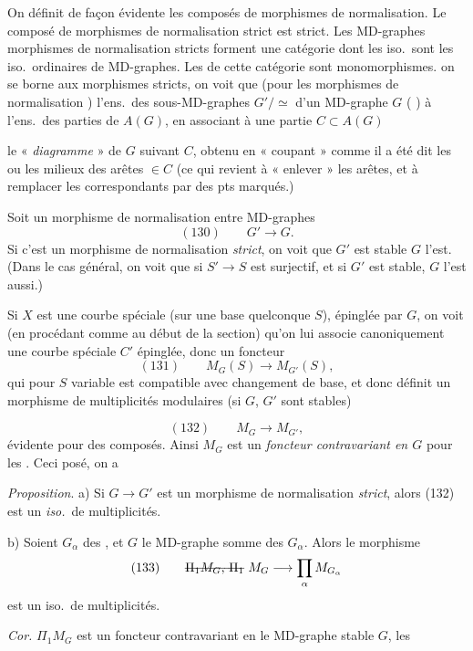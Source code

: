 \documentclass[11pt,a4paper]{article}
\begin{document}
On définit de façon évidente les composés de morphismes de normalisation. Le composé de morphismes de normalisation strict est strict. Les MD-graphes  morphismes de normalisation stricts forment une catégorie dont les iso.\ sont les iso.\ ordinaires de MD-graphes. Les  de cette catégorie sont  monomorphismes. \struck{\ill{}}  on se borne aux morphismes  stricts, on voit que (pour les morphismes de normalisation ) l'ens.\ des sous-MD-graphes $G'/\!\simeq$  d'un MD-graphe $G$ (\struck{\ill{}}  \ill{})  à l'ens.\ des parties de $A(G)$, en associant à une partie $C \subset A(G)$

le « \emph{diagramme} » de $G$ suivant $C$, obtenu en « coupant » comme il a été dit les  ou les milieux des arêtes $\in C$ (ce qui revient à « enlever » les arêtes, et à remplacer les  correspondants par des pts marqués.)

Soit un morphisme de normalisation entre MD-graphes
\[
(130)\qquad G' \longrightarrow G .
\]
Si c'est un morphisme de normalisation \emph{strict}, on voit que $G'$ est stable  $G$ l'est. (Dans le cas général, on voit que si $S' \to S$ est surjectif, et si $G'$ est stable, $G$ l'est aussi.)

 Si $X$ est une courbe spéciale (sur une base quelconque $S$), épinglée par $G$,  on voit (en procédant comme au début de la section) qu'on lui associe canoniquement une courbe spéciale $C'$ épinglée, donc un foncteur
\[
(131)\qquad M_{G}(S) \longrightarrow M_{G'}(S) ,
\]
qui pour $S$ variable est compatible avec changement de base, et donc définit un morphisme de multiplicités modulaires (si $G$, $G'$ sont stables)

\[
(132)\qquad M_{G} \longrightarrow M_{G'} ,
\]
  évidente pour des composés. Ainsi $M_{G}$ est un \emph{foncteur contravariant en $G$} pour les  . Ceci posé, on a

\emph{Proposition}. a) Si $G \to G'$ est un morphisme de normalisation \emph{strict}, alors (132) est un \emph{iso.}\ de multiplicités.

b) Soient $G_{\alpha}$ des  , et $G$ le MD-graphe somme des $G_{\alpha}$. Alors le morphisme
\[
(133)\qquad \text{\struck{$\Pi_{1}M_{G}$, $\Pi_{1}$}}\ M_{G} \longrightarrow \prod_{\alpha} M_{G_{\alpha}}
\]
est un iso.\ de multiplicités.

\emph{Cor.} $\Pi_{1}M_{G}$ est un foncteur contravariant en le MD-graphe stable $G$,  les
\end{document}

